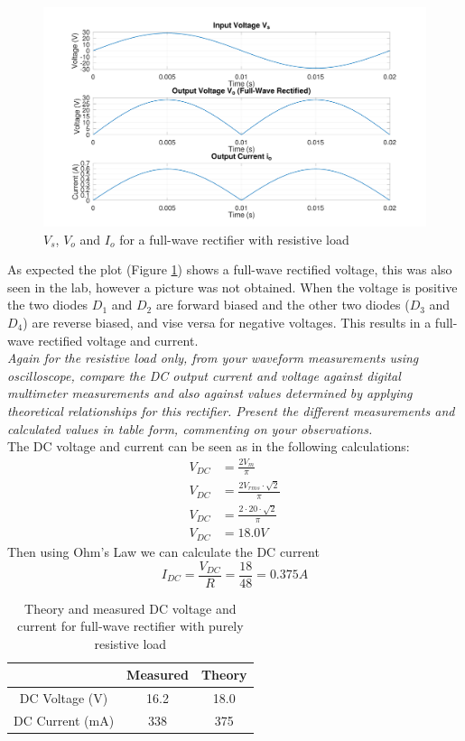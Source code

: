 \documentclass[12pt,a4paper]{article}
\begin{document}
\begin{figure}[H]
\centering
\includegraphics[width=.7\columnwidth]{ENG306_Lab_2_Full_Wave_Rectifier.png}
\caption{\(V_s\), \(V_o\) and \(I_o\) for a full-wave rectifier with resistive load \label{fig:figure2}}
\end{figure}

As expected the plot (Figure \ref{fig:figure2}) shows a full-wave rectified voltage, this was also seen in the lab, however a picture was not obtained. When the voltage is positive the two diodes $D_1$ and $D_2$ are forward biased and the other two diodes ($D_3$ and $D_4$) are reverse biased, and vise versa for negative voltages. This results in a full-wave rectified voltage and current.\\

\textit{Again for the resistive load only, from your waveform measurements using oscilloscope, compare
the DC output current and voltage against digital multimeter measurements and also against values
determined by applying theoretical relationships for this rectifier. Present the different measurements
and calculated values in table form, commenting on your observations.}\\

The DC voltage and current can be seen as in the following calculations:
\begin{align*}
V_{DC} &= \frac{2V_m}{\pi} \\
V_{DC} &= \frac{2V_{rms}\cdot\sqrt{2}}{\pi} \\
V_{DC} &= \frac{2 \cdot 20\cdot\sqrt{2}}{\pi} \\
V_{DC} &= 18.0V
\end{align*}
Then using Ohm's Law we can calculate the DC current
\[I_{DC} = \frac{V_{DC}}{R} = \frac{18}{48} = 0.375A\]

\begin{table}[H]
\caption{Theory and measured DC voltage and current for full-wave rectifier with purely resistive load \label{tab:table2}}
\centering
\begin{tabular}{|c|c|c|}
\hline
 & Measured & Theory\\
\hline
DC Voltage (V) & 16.2 & 18.0\\
\hline
DC Current (mA) & 338 & 375\\
\hline
\end{tabular}
\end{table}
\end{document}
